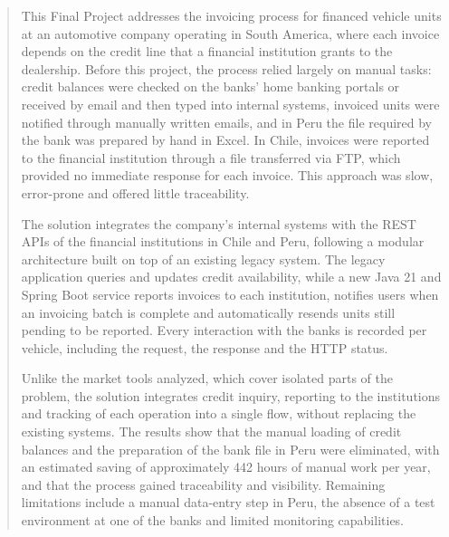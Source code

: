 \begin{abstract}

This Final Project addresses the invoicing process for financed vehicle units at an automotive company operating in South America, where each invoice depends on the credit line that a financial institution grants to the dealership. Before this project, the process relied largely on manual tasks: credit balances were checked on the banks' home banking portals or received by email and then typed into internal systems, invoiced units were notified through manually written emails, and in Peru the file required by the bank was prepared by hand in Excel. In Chile, invoices were reported to the financial institution through a file transferred via FTP, which provided no immediate response for each invoice. This approach was slow, error-prone and offered little traceability.

The solution integrates the company's internal systems with the REST APIs of the financial institutions in Chile and Peru, following a modular architecture built on top of an existing legacy system. The legacy application queries and updates credit availability, while a new Java 21 and Spring Boot service reports invoices to each institution, notifies users when an invoicing batch is complete and automatically resends units still pending to be reported. Every interaction with the banks is recorded per vehicle, including the request, the response and the HTTP status.

Unlike the market tools analyzed, which cover isolated parts of the problem, the solution integrates credit inquiry, reporting to the institutions and tracking of each operation into a single flow, without replacing the existing systems. The results show that the manual loading of credit balances and the preparation of the bank file in Peru were eliminated, with an estimated saving of approximately 442 hours of manual work per year, and that the process gained traceability and visibility. Remaining limitations include a manual data-entry step in Peru, the absence of a test environment at one of the banks and limited monitoring capabilities.

\end{abstract}
